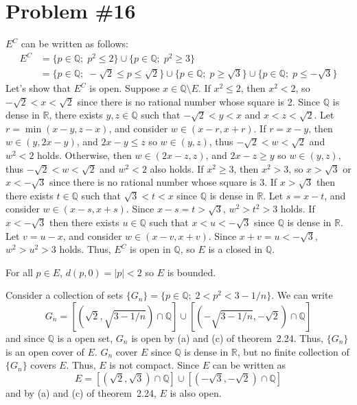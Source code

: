 \documentclass{scrartcl}
\begin{document}
\section{Problem \#16}
\(E^C\) can be written as follows:
\begin{align*}
  E^C &= \{p \in \mathbb{Q};\; p^2 \leq 2\} \cup \{p \in \mathbb{Q};\; p^2 \geq 3\} \\
      &= \{p \in \mathbb{Q};\; -\sqrt{2} \leq p \leq \sqrt{2}\} \cup \{p \in \mathbb{Q};\; p \geq \sqrt{3}\} \cup \{p \in \mathbb{Q};\; p \leq -\sqrt{3}\}
\end{align*}
Let's show that \(E^C\) is open.
Suppose \(x \in \mathbb{Q} \setminus E\).
If \(x^2 \leq 2\), then \(x^2 < 2\), so \(-\sqrt{2} < x < \sqrt{2}\) since there is no rational number whose square is 2.
Since \(\mathbb{Q}\) is dense in \(\mathbb{R}\), there exists \(y, z \in \mathbb{Q}\) such that \(-\sqrt{2} < y < x\) and \(x < z < \sqrt{2}\).
Let \(r = \min(x - y, z - x)\), and consider \(w \in (x - r, x + r)\).
If \(r = x - y\), then \(w \in (y, 2x - y)\), and \(2x - y \leq z\) so \(w \in (y, z)\), thus \(-\sqrt{2} < w < \sqrt{2}\) and \(w^2 < 2\) holds.
Otherwise, then \(w \in (2x - z, z)\), and \(2x - z \geq y\) so \(w \in (y, z)\), thus \(-\sqrt{2} < w < \sqrt{2}\) and \(w^2 < 2\) also holds.
If \(x^2 \geq 3\), then \(x^2 > 3\), so \(x > \sqrt{3}\) or \(x < -\sqrt{3}\) since there is no rational number whose square is 3.
If \(x > \sqrt{3}\) then there exists \(t \in \mathbb{Q}\) such that \(\sqrt{3} < t < x\) since \(\mathbb{Q}\) is dense in \(\mathbb{R}\).
Let \(s = x - t\), and consider \(w \in (x - s, x + s)\).
Since \(x - s = t > \sqrt{3}\), \(w^2 > t^2 > 3\) holds.
If \(x < -\sqrt{3}\) then there exists \(u \in \mathbb{Q}\) such that \(x < u < -\sqrt{3}\) since \(\mathbb{Q}\) is dense in \(\mathbb{R}\).
Let \(v = u - x\), and consider \(w \in (x - v, x + v)\).
Since \(x + v = u < -\sqrt{3}\), \(w^2 > u^2 > 3\) holds.
Thus, \(E^C\) is open in \(\mathbb{Q}\), so \(E\) is a closed in \(\mathbb{Q}\).

For all \(p \in E\), \(d(p, 0) = |p| < 2\) so \(E\) is bounded.

Consider a collection of sets \(\{G_n\} = \{p \in \mathbb{Q};\; 2 < p^2 < 3 - 1 / n\}\).
We can write
\[
  G_n = [(\sqrt{2}, \sqrt{3 - 1 / n}) \cap \mathbb{Q}] \cup [(-\sqrt{3 - 1 / n}, -\sqrt{2}) \cap \mathbb{Q}]
\]
and since \(\mathbb{Q}\) is a open set, \(G_n\) is open by (a) and (c) of theorem~2.24.
Thus, \(\{G_n\}\) is an open cover of \(E\).
\(G_n\) cover \(E\) since \(\mathbb{Q}\) is dense in \(\mathbb{R}\), but no finite collection of \(\{G_n\}\) covers \(E\).
Thus, \(E\) is not compact.
Since \(E\) can be written as
\[
  E = [(\sqrt{2}, \sqrt{3}) \cap \mathbb{Q}] \cup [(-\sqrt{3}, -\sqrt{2}) \cap \mathbb{Q}]
\]
and by (a) and (c) of theorem~2.24, \(E\) is also open.
\end{document}
